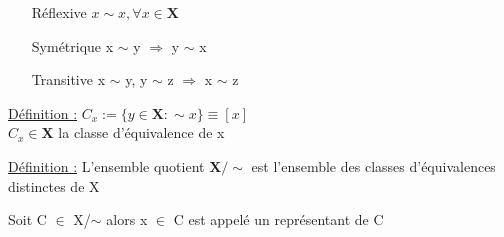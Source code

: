 \documentclass[12pt,a4paper]{article}
\begin{document}
\begin{itemize}
\item[Réflexive] $x \sim x, \forall x \in \mathbf{X}$
\item[Symétrique] x $\sim$ y $\Rightarrow$ y $\sim$ x
\item[Transitive] x $\sim$ y, y $\sim$ z $\Rightarrow$ x $\sim$ z
\end{itemize}
\begin{boite}
\underline{Définition :} $C_x := \{y \in \mathbf{X} : \sim x\} \equiv [x]$\\
$C_x \in \mathbf{X}$ la classe d'équivalence de x
\end{boite}

\begin{boite}
\underline{Définition :} L'ensemble quotient $\mathbf{X}/ \sim$ est l'ensemble des classes d'équivalences distinctes de X
\end{boite}
 Soit C $\in$ X/$\sim$ alors x $\in$ C est appelé un représentant de C
\end{document}
